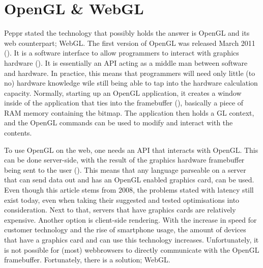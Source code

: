 \clearpage
\section{OpenGL \& WebGL}
Peppr stated the technology that possibly holds the answer is OpenGL and its web counterpart; WebGL.
The first version of OpenGL was released March 2011 (\cite{openGLsite}). It is a software interface to allow programmers to interact with graphics hardware (\cite{openGLSpecification}). It is essentially an API acting as a middle man between software and hardware. In practice, this means that programmers will need only little (to no) hardware knowledge wile still being able to tap into the hardware calculation capacity. Normally, starting up an OpenGL application, it creates a window inside of the application that ties into the framebuffer (\cite{framebuffer}), basically a piece of RAM memory containing the bitmap. The application then holds a GL context, and the OpenGL commands can be used to modify and interact with the contents.

To use OpenGL on the web, one needs an API that interacts with OpenGL. This can be done server-side, with the result of the graphics hardware framebuffer being sent to the user (\cite{CRRS}). This means that any language parseable on a server that can send data out and has an OpenGL enabled graphics card, can be used. Even though this article stems from 2008, the problems stated with latency still exist today, even when taking their suggested and tested optimisations into consideration. Next to that, servers that have graphics cards are relatively expensive. Another option is client-side rendering. With the increase in speed for customer technology and the rise of smartphone usage, the amount of devices that have a graphics card and can use this technology increases. Unfortunately, it is not possible for (most) webbrowsers to directly communicate with the OpenGL framebuffer. Fortunately, there is a solution; WebGL.

\cite{webGL}

